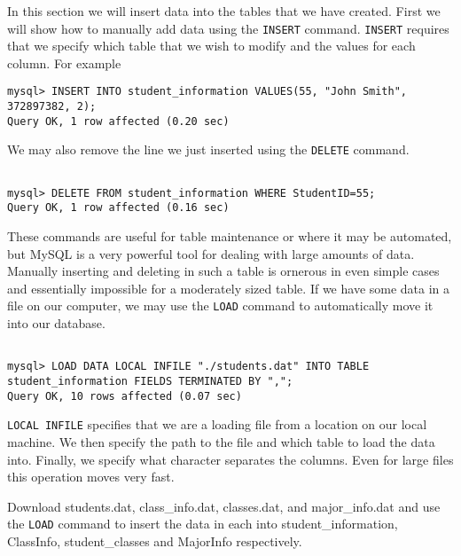 In this section we will insert data into the tables that we have created.  First we will show how to manually add data using the {\tt INSERT} command.  {\tt INSERT} requires that we specify which table that we wish to modify and the values for each column.  For example

\begin{lstlisting}
mysql> INSERT INTO student_information VALUES(55, "John Smith", 372897382, 2);
Query OK, 1 row affected (0.20 sec)
\end{lstlisting}

We may also remove the line we just inserted using the {\tt DELETE} command.

\begin{lstlisting}

mysql> DELETE FROM student_information WHERE StudentID=55;
Query OK, 1 row affected (0.16 sec)

\end{lstlisting}

These commands are useful for table maintenance or where it may be automated, but MySQL is a very powerful tool for dealing with large amounts of data.  Manually inserting and deleting in such a table is ornerous in even simple cases and essentially impossible for a moderately sized table.  If we have some data in a file on our computer, we may use the {\tt LOAD} command to automatically move it into our database.

\begin{lstlisting}

mysql> LOAD DATA LOCAL INFILE "./students.dat" INTO TABLE student_information FIELDS TERMINATED BY ",";
Query OK, 10 rows affected (0.07 sec)

\end{lstlisting}

{\tt LOCAL INFILE} specifies that we are a loading file from a location on our local machine.  We then specify the path to the file and which table to load the data into.  Finally, we specify what character separates the columns.  Even for large files this operation moves very fast.

\begin{problem}

Download students.dat, class\_info.dat, classes.dat, and major\_info.dat and use the {\tt LOAD} command to insert the data in each into student\_information, ClassInfo, student\_classes and MajorInfo respectively.

\end{problem}


